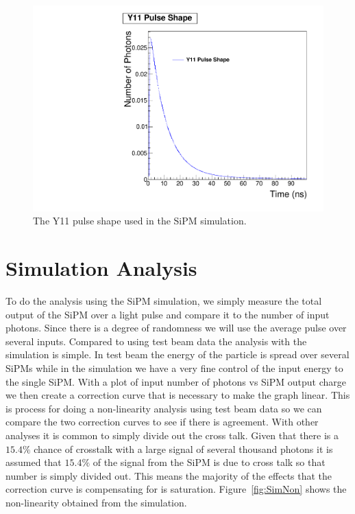 \begin{figure}
\centering
\includegraphics[width=0.8\linewidth]{Figures/Y11.pdf}
\caption{The Y11 pulse shape used in the SiPM simulation.}
\label{fig:Y11}
\end{figure}

\section{Simulation Analysis}

To do the analysis using the SiPM simulation, we simply measure the total output of the SiPM over a light pulse and compare it to the number of input photons. Since there is a degree of randomness we will use the average pulse over several inputs. Compared to using test beam data the analysis with the simulation is simple. In test beam the energy of the particle is spread over several SiPMs while in the simulation we have a very fine control of the input energy to the single SiPM. With a plot of input number of photons vs SiPM output charge we then create a correction curve that is necessary to make the graph linear. This is process for doing a non-linearity analysis using test beam data so we can compare the two correction curves to see if there is agreement. With other analyses it is common to simply divide out the cross talk. Given that there is a $15.4\%$ chance of crosstalk with a large signal of several thousand photons it is assumed that $15.4\%$ of the signal from the SiPM is due to cross talk so that number is simply divided out. This means the majority of the effects that the correction curve is compensating for is saturation. Figure~\ref{fig:SimNon} shows the non-linearity obtained from the simulation.

